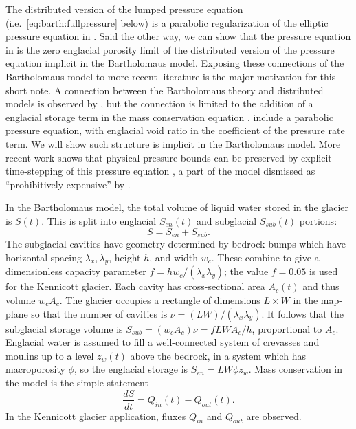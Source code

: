 \documentclass[review,letterpaper]{igs}
\begin{document}
The distributed version of the lumped pressure equation (i.e.~\eqref{eq:barth:fullpressure} below) is a parabolic regularization of the elliptic pressure equation in \cite{Schoofetal2012}.  Said the other way, we can show that the pressure equation in \cite{Schoofetal2012} is the zero englacial porosity limit of the distributed version of the pressure equation implicit in the Bartholomaus model.  Exposing these connections of the Bartholomaus model to more recent literature is the major motivation for this short note.  A connection between the Bartholomaus theory and distributed models is observed by \cite{Hewitt2013}, but the connection is limited to the addition of a englacial storage term in the mass conservation equation \cite[equation (7)]{Hewitt2013}.  \cite{Werderetal2013} include a parabolic pressure equation, with englacial void ratio in the coefficient of the pressure rate term.   We will show such structure is implicit in the Bartholomaus model.  More recent work shows that physical pressure bounds can be preserved by explicit time-stepping of this pressure equation \cite{BuelervanPeltDRAFT}, a part of the model dismissed as ``prohibitively expensive'' by \cite{Werderetal2013}.

In the Bartholomaus model, the total volume of liquid water stored in the glacier is $S(t)$.  This is split into englacial $S_{en}(t)$ and subglacial $S_{sub}(t)$ portions:
\begin{equation}
S = S_{en} + S_{sub}.  \label{eq:barth:kinematics}
\end{equation}
The subglacial cavities have geometry determined by bedrock bumps which have horizontal spacing $\lambda_x,\lambda_y$, height $h$, and width $w_c$.  These combine to give a dimensionless capacity parameter $f=h w_c/(\lambda_x \lambda_y)$; the value $f=0.05$ is used for the Kennicott glacier.  Each cavity has cross-sectional area $A_c(t)$ and thus volume $w_c A_c$.  The glacier occupies a rectangle of dimensions $L\times W$ in the map-plane so that the number of cavities is $\nu = (LW)/(\lambda_x\lambda_y)$.  It follows that the subglacial storage volume is $S_{sub} = (w_c A_c) \nu = f L W A_c / h$, proportional to $A_c$.  Englacial water is assumed to fill a well-connected system of crevasses and moulins up to a level $z_w(t)$ above the bedrock, in a system which has macroporosity $\phi$, so the englacial storage is $S_{en}=L W \phi z_w$.  Mass conservation in the model is the simple statement \citep{Bartholomausetal2008}
\begin{equation}
\frac{dS}{dt} = Q_{in}(t) - Q_{out}(t). \label{eq:barth:massconserve}
\end{equation}
In the Kennicott glacier application, fluxes $Q_{in}$ and $Q_{out}$ are observed.
\end{document}
